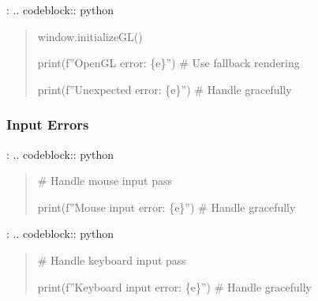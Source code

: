 \documentclass[a4paper,10pt,english,openany,oneside]{sphinxmanual}
\begin{document}
\sphinxAtStartPar
{}:
.. code\sphinxhyphen{}block:: python
\begin{quote}
\begin{description}
\sphinxAtStartPar
window.initializeGL()

\sphinxAtStartPar
print(f”OpenGL error: \{e\}”)
\# Use fallback rendering

\sphinxAtStartPar
print(f”Unexpected error: \{e\}”)
\# Handle gracefully

\end{description}
\end{quote}


\subsubsection{Input Errors}
\label{\detokenize{api/ui:input-errors}}
\sphinxAtStartPar
{}:
.. code\sphinxhyphen{}block:: python
\begin{quote}
\begin{description}
\begin{description}
\sphinxAtStartPar
\# Handle mouse input
pass

\sphinxAtStartPar
print(f”Mouse input error: \{e\}”)
\# Handle gracefully

\end{description}

\end{description}
\end{quote}

\sphinxAtStartPar
{}:
.. code\sphinxhyphen{}block:: python
\begin{quote}
\begin{description}
\begin{description}
\sphinxAtStartPar
\# Handle keyboard input
pass

\sphinxAtStartPar
print(f”Keyboard input error: \{e\}”)
\# Handle gracefully

\end{description}

\end{description}
\end{quote}
\end{document}
